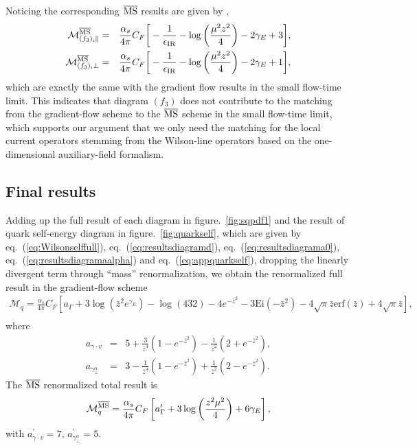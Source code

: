 Noticing the corresponding $\overline{\rm MS}$ results are given by \cite{Izubuchi:2018srq},
\begin{eqnarray}
\mathcal{M}_{(f_3), \|}^{\overline{\rm MS}} &= &\frac{\alpha_s}{4\pi}C_F\bigg[-\frac{1}{\epsilon_{\rm IR}} - \log\left(\frac{\mu^2z^2}{4}\right) -2\gamma_E +3 \bigg],\\
\mathcal{M}_{(f_3), \perp}^{\overline{\rm MS}} &= &\frac{\alpha_s}{4\pi}C_F\bigg[-\frac{1}{\epsilon_{\rm IR}} - \log\left(\frac{\mu^2z^2}{4}\right) -2\gamma_E +1 \bigg],
\end{eqnarray}
which are exactly the same with the gradient flow results in the small flow-time limit. This indicates that diagram $(f_3)$ does not contribute to the matching from the gradient-flow scheme to 
the $\overline{\rm MS}$ scheme in the small flow-time limit, which supports our argument that we only need the matching for the local current operators stemming from the Wilson-line operators based on the one-dimensional auxiliary-field formalism.

\subsection{Final results}
Adding up the full result of each diagram in figure.~\ref{fig:sqpdf1} and the result of quark self-energy diagram in figure.~\ref{fig:quarkself}, which are given by eq.~(\ref{eq:Wilsonselffull}), eq.~(\ref{eq:resultsdiagramd}), 
eq.~(\ref{eq:resultsdiagrama0}), eq.~(\ref{eq:resultsdiagramaalpha}) and eq.~(\ref{eq:appquarkself}), dropping the linearly divergent term through ``mass” renormalization, we obtain the renormalized full result in the gradient-flow scheme
\begin{eqnarray}
\label{eq:quarkquasiGFfull}
\mathcal{M}_{q} = \frac{\alpha_s}{4\pi}C_F\left[a_{\Gamma}  + 3\log\left(\bar{z}^2e^{\gamma_E}\right)-\log(432)-4e^{-\bar{z}^2} - 3\text{Ei}(-\bar{z}^2) -4\sqrt{\pi}\bar{z}\text{erf}(\bar{z}) + 4\sqrt{\pi}\bar{z} \right],\nonumber\\
\end{eqnarray}
where
\begin{eqnarray}
a_{\gamma\cdot v}&=& 5 +\frac{3}{\bar{z}^4}\left(1-e^{-\bar{z}^2}\right) -\frac{1}{\bar{z}^2}\left(2+e^{-\bar{z}^2}\right),\\
a_{\gamma^{\alpha}_\perp}&=& 3 - \frac{1}{\bar{z}^4}\left(1-e^{-\bar{z}^2}\right) + \frac{1}{\bar{z}^2}\left(2-e^{-\bar{z}^2}\right).
\end{eqnarray}
The $\overline{\rm MS}$ renormalized  total result is 
\begin{eqnarray}
\mathcal{M}_{q}^{\overline{\rm MS}} = \frac{\alpha_s}{4\pi}C_F\left[a^\prime_{\Gamma}+ 3\log\left(\frac{z^2\mu^2}{4}\right)+6\gamma_E\right],
\end{eqnarray}
with $a^\prime_{\gamma\cdot v} = 7,\, a^\prime_{\gamma^{\alpha}_\perp} = 5$.

